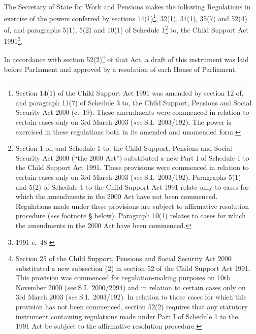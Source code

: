 \documentclass[12pt,a4paper]{article}
\title{\regstitle}
\author{S.I.\ 2007 No.\ 1979}
\date{Made
11th July 2007\\
Coming into force
1st August 2007
}
\begin{document}
\maketitle

\noindent
The Secretary of State for Work and Pensions makes the following Regulations in exercise of the powers conferred by sections 14(1)\footnote{Section 14(1) of the Child Support Act 1991 was amended by section 12 of, and paragraph 11(7) of Schedule 3 to, the Child Support, Pensions and Social Security Act 2000 (c.\ 19). These amendments were commenced in relation to certain cases only on 3rd March 2003 (\emph{see} S.I.\ 2003/192). The power is exercised in these regulations both in its amended and unamended form.}, 32(1), 34(1), 35(7) and 52(4) of, and paragraphs 5(1), 5(2) and 10(1) of Schedule 1\footnote{Section 1 of, and Schedule 1 to, the Child Support, Pensions and Social Security Act 2000 (“the 2000 Act”) substituted a new Part I of Schedule 1 to the Child Support Act 1991. These provisions were commenced in relation to certain cases only on 3rd March 2003 (\emph{see} S.I.\ 2003/192). Paragraphs 5(1) and 5(2) of Schedule 1 to the Child Support Act 1991 relate only to cases for which the amendments in the 2000 Act have not been commenced. Regulations made under these provisions are subject to affirmative resolution procedure (\emph{see} footnote \S{} below). Paragraph 10(1) relates to cases for which the amendments in the 2000 Act have been commenced.} to, the Child Support Act 1991\footnote{1991 c.\ 48.}.

In accordance with section 52(2)\footnote{Section 25 of the Child Support, Pensions and Social Security Act 2000 substituted a new subsection (2) in section 52 of the Child Support Act 1991. This provision was commenced for regulation-making purposes on 10th November 2000 (\emph{see} S.I.\ 2000/2994) and in relation to certain cases only on 3rd March 2003 (\emph{see} S.I.\ 2003/192). In relation to those cases for which this provision has not been commenced, section 52(2) requires that any statutory instrument containing regulations made under Part I of Schedule 1 to the 1991 Act be subject to the affirmative resolution procedure.} of that Act, a draft of this instrument was laid before Parliament and approved by a resolution of each House of Parliament. 

\vfill

{\sloppy

\tableofcontents

}

\bigskip
\end{document}
